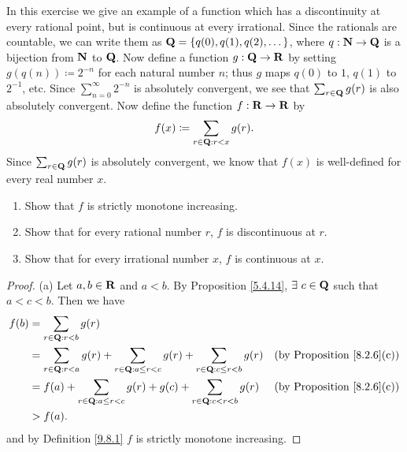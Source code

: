\begin{exercise}\label{ex 9.8.5}
    In this exercise we give an example of a function which has a discontinuity at every rational point, but is continuous at every irrational.
    Since the rationals are countable, we can write them as \(\mathbf{Q} = \{q(0), q(1), q(2), \dots\}\), where \(q : \mathbf{N} \to \mathbf{Q}\) is a bijection from \(\mathbf{N}\) to \(\mathbf{Q}\).
    Now define a function \(g : \mathbf{Q} \to \mathbf{R}\) by setting \(g(q(n)) \coloneqq 2^{-n}\) for each natural number \(n\);
    thus \(g\) maps \(q(0)\) to \(1\), \(q(1)\) to \(2^{-1}\), etc.
    Since \(\sum_{n = 0}^\infty 2^{-n}\) is absolutely convergent, we see that \(\sum_{r \in \mathbf{Q}} g(r)\) is also absolutely convergent.
    Now define the function \(f : \mathbf{R} \to \mathbf{R}\) by
    \[
        f(x) \coloneqq \sum_{r \in \mathbf{Q} : r < x} g(r).
    \]
    Since \(\sum_{r \in \mathbf{Q}} g(r)\) is absolutely convergent, we know that \(f(x)\) is well-defined for every real number \(x\).
    \begin{enumerate}
        \item Show that \(f\) is strictly monotone increasing.
        \item Show that for every rational number \(r\), \(f\) is discontinuous at \(r\).
        \item Show that for every irrational number \(x\), \(f\) is continuous at \(x\).
    \end{enumerate}
\end{exercise}

\begin{proof}{(a)}
    Let \(a, b \in \mathbf{R}\) and \(a < b\).
    By Proposition \ref{5.4.14}, \(\exists\ c \in \mathbf{Q}\) such that \(a < c < b\).
    Then we have
    \begin{align*}
        f(b) & = \sum_{r \in \mathbf{Q} : r < b} g(r)                                                                                                                      \\
             & = \sum_{r \in \mathbf{Q} : r < a} g(r) + \sum_{r \in \mathbf{Q} : a \leq r < c} g(r) + \sum_{r \in \mathbf{Q} : c \leq r < b} g(r) & \text{(by Proposition \ref{8.2.6}(c))} \\
             & = f(a) + \sum_{r \in \mathbf{Q} : a \leq r < c} g(r) + g(c) + \sum_{r \in \mathbf{Q} : c < r < b} g(r)                     & \text{(by Proposition \ref{8.2.6}(c))} \\
             & > f(a).
    \end{align*}
    and by Definition \ref{9.8.1} \(f\) is strictly monotone increasing.
\end{proof}


